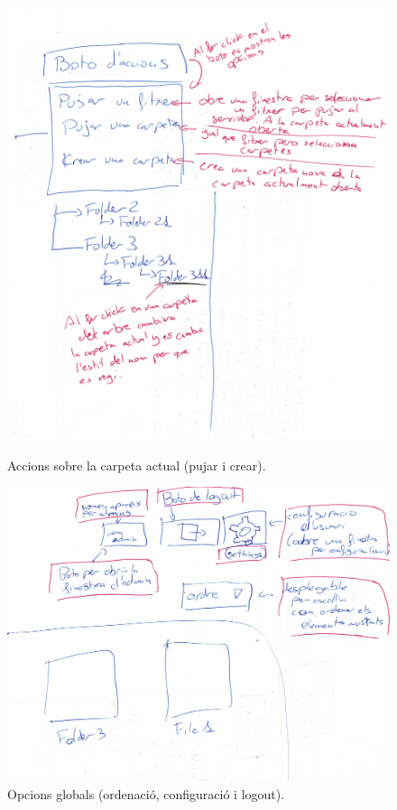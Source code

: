 \begin{figure}[H]
    \centering
    \begin{minipage}{0.48\textwidth}
        \centering
        \includegraphics[width=\linewidth]{Figures/interficies/react-boto-de-accions.jpg}
        \caption{Accions sobre la carpeta actual (pujar i crear).}
        \label{fig:react-boto-de-accions}
    \end{minipage}\hfill
    \begin{minipage}{0.48\textwidth}
        \centering
        \includegraphics[width=\linewidth]{Figures/interficies/react-botons-esquina-sup-der.jpg}
        \caption{Opcions globals (ordenació, configuració i logout).}
        \label{fig:react-botons-esquina-sup-der}
    \end{minipage}
\end{figure}

